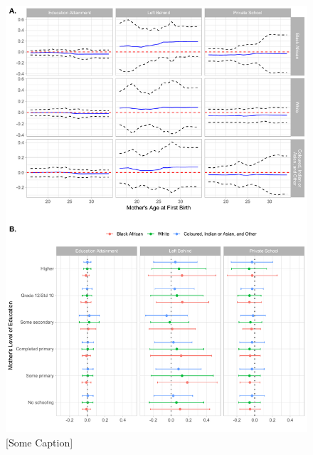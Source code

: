 \documentclass[11pt,a4paper]{article}
\begin{document}
\begin{figure}[h!]
\centering
\caption{\label{fig:07}[Some Caption]}
\includegraphics[width=\textwidth]{figures/heter2.pdf}
\end{figure}




 

\end{document}
